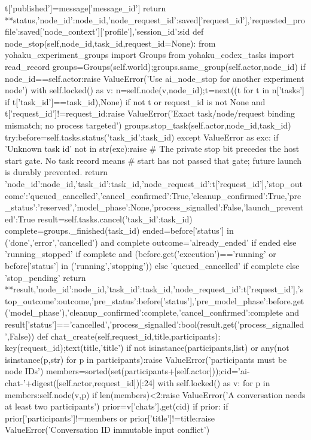      t['published']=message['message_id']
  return {**status,'node_id':node_id,'node_request_id':saved['request_id'],'requested_profile':saved['node_context']['profile'],'session_id':sid}
 def node_stop(self,node_id,task_id,request_id=None):
  from yohaku_experiment_groups import Groups
  from yohaku_codex_tasks import read_record
  groups=Groups(self.world);groups.same_group(self.actor,node_id)
  if node_id==self.actor:raise ValueError('Use ai_node_stop for another experiment node')
  with self.locked() as v:
   n=self.node(v,node_id);t=next((t for t in n['tasks'] if t['task_id']==task_id),None)
   if not t or request_id is not None and t['request_id']!=request_id:raise ValueError('Exact task/node/request binding mismatch; no process targeted')
  groups.stop_task(self.actor,node_id,task_id)
  try:before=self.tasks.status({'task_id':task_id})
  except ValueError as exc:
   if 'Unknown task id' not in str(exc):raise
   # The private stop bit precedes the host start gate. No task record means
   # start has not passed that gate; future launch is durably prevented.
   return {'node_id':node_id,'task_id':task_id,'node_request_id':t['request_id'],'stop_outcome':'queued_cancelled','cancel_confirmed':True,'cleanup_confirmed':True,'pre_status':'reserved','model_phase':None,'process_signalled':False,'launch_prevented':True}
  result=self.tasks.cancel({'task_id':task_id})
  complete=groups._finished(task_id)
  ended=before['status'] in ('done','error','cancelled') and complete
  outcome='already_ended' if ended else 'running_stopped' if complete and (before.get('execution')=='running' or before['status'] in ('running','stopping')) else 'queued_cancelled' if complete else 'stop_pending'
  return {**result,'node_id':node_id,'task_id':task_id,'node_request_id':t['request_id'],'stop_outcome':outcome,'pre_status':before['status'],'pre_model_phase':before.get('model_phase'),'cleanup_confirmed':complete,'cancel_confirmed':complete and result['status']=='cancelled','process_signalled':bool(result.get('process_signalled',False))}
 def chat_create(self,request_id,title,participants):
  key(request_id);text(title,'title')
  if not isinstance(participants,list) or any(not isinstance(p,str) for p in participants):raise ValueError('participants must be node IDs')
  members=sorted(set(participants+[self.actor]));cid='ai-chat-'+digest([self.actor,request_id])[:24]
  with self.locked() as v:
   for p in members:self.node(v,p)
   if len(members)<2:raise ValueError('A conversation needs at least two participants')
   prior=v['chats'].get(cid)
   if prior:
    if prior['participants']!=members or prior['title']!=title:raise ValueError('Conversation ID immutable input conflict')
